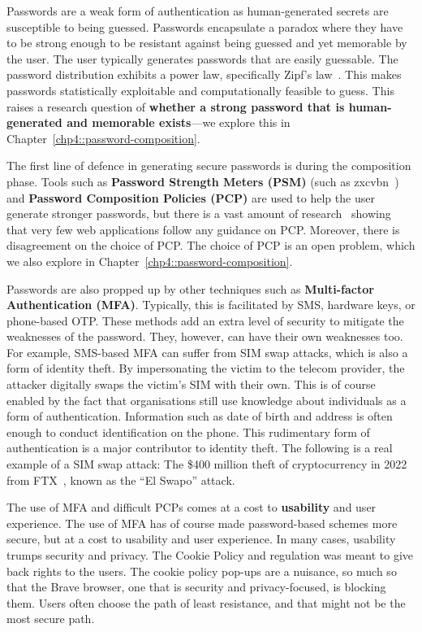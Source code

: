 Passwords are a weak form of authentication as human-generated secrets are susceptible to being guessed. Passwords encapsulate a paradox where they have to be strong enough to be resistant against being guessed and yet memorable by the user. The user typically generates passwords that are easily guessable. The password distribution exhibits a power law, specifically Zipf's law~\cite{wang_zipfs_2017}. This makes passwords statistically exploitable and computationally feasible to guess. This raises a research question of \textbf{whether a strong password that is human-generated and memorable exists}---we explore this in Chapter~\ref{chp4::password-composition}.

The first line of defence in generating secure passwords is during the composition phase. Tools such as \textbf{Password Strength Meters (PSM)} (such as zxcvbn~\cite{zxcvbn2016}) and \textbf{Password Composition Policies (PCP)} are used to help the user generate stronger passwords, but there is a vast amount of research~\cite{alroomi_measuring_2023, lomchan_comparison_2023, lim_evaluating_2023, maoneke_password_2019, furnell_assessing_2011, woo_survey_2018, lee_password_2022, gerlitz_please_2021, preibusch_password_2010} showing that very few web applications follow any guidance on PCP. Moreover, there is disagreement on the choice of PCP. The choice of PCP is an open problem, which we also explore in Chapter~\ref{chp4::password-composition}.

Passwords are also propped up by other techniques such as \textbf{Multi-factor Authentication (MFA)}. Typically, this is facilitated by SMS, hardware keys, or phone-based OTP. These methods add an extra level of security to mitigate the weaknesses of the password. They, however, can have their own weaknesses too. For example, SMS-based MFA can suffer from SIM swap attacks, which is also a form of identity theft. By impersonating the victim to the telecom provider, the attacker digitally swaps the victim's SIM with their own. This is of course enabled by the fact that organisations still use knowledge about individuals as a form of authentication. Information such as date of birth and address is often enough to conduct identification on the phone. This rudimentary form of authentication is a major contributor to identity theft. The following is a real example of a SIM swap attack: The \$400 million theft of cryptocurrency in 2022 from FTX~\cite{krebs_arrests_2024, belanger_sim-swapping_2024}, known as the ``El Swapo'' attack.

The use of MFA and difficult PCPs comes at a cost to \textbf{usability} and user experience. The use of MFA has of course made password-based schemes more secure, but at a cost to usability and user experience. In many cases, usability trumps security and privacy. The Cookie Policy and regulation was meant to give back rights to the users. The cookie policy pop-ups are a nuisance, so much so that the Brave browser, one that is security and privacy-focused, is blocking them. Users often choose the path of least resistance, and that might not be the most secure path.

